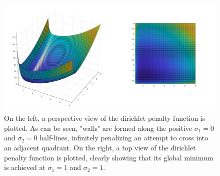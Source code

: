 \begin{figure}[ht]
\centering
\includegraphics[width=16cm]{figures/dirichlet/symmetric_dirichlet_penalty_function.png}
\caption[The Symmetric Dirichlet Penalty Function]{On the left, a perspective view of the dirichlet penalty function is plotted. As can be seen, "walls" are formed along the positive $\sigma_1 = 0$ and $\sigma_2 = 0$ half-lines, infinitely penalizing an attempt to cross into an adjacent quadrant. On the right, a top view of the dirichlet penalty function is plotted, clearly showing that its global minimum is achieved at $\sigma_1 = 1$ and $\sigma_2 = 1$.}
\label{fig:dirichlet_penalty_function}
\end{figure}
